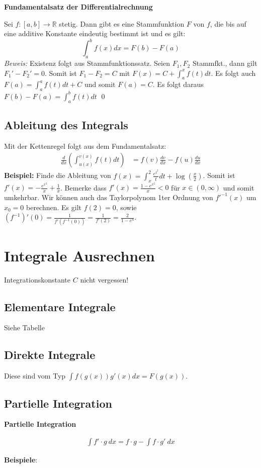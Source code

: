 \documentclass[25pt]{sciposter}
\newcommand{\R}{\mathbb{R}}
\newenvironment{method}[1]{\begin{mdframed}[backgroundcolor=blue!10,innertopmargin=15pt, innerbottommargin=15pt, nobreak=true]
		\textbf{#1 }
	}
	{ 
	\end{mdframed}
}
\newenvironment{important}{\begin{mdframed}[backgroundcolor=red!50,innertopmargin=15pt, innerbottommargin=15pt, nobreak=true]
		\Large
	}
	{ 
	\end{mdframed}
}
\begin{document}
\begin{multicols}{3}
\begin{method}{Fundamentalsatz der Differentialrechnung}
Sei $f:[a,b] \to \R$ stetig. Dann gibt es eine Stammfunktion $F$ von $f$, die bis auf eine additive Konstante eindeutig bestimmt ist und es gilt:
$$\int_{a}^{b} f(x) dx = F(b) - F(a)$$
\textit{Beweis:} Existenz folgt aus Stammfunktionssatz. Seien $F_1, F_2$ Stammfkt., dann gilt $F_1' - F_2' = 0$. Somit ist $F_1 - F_2 = C$ mit $F(x) = C + \int_{a}^{x} f(t) dt$. Es folgt auch $F(a) = \int_{a}^{a} f(t) dt + C$ und somit $F(a) = C$. Es folgt daraus $F(b)-F(a) = \int_{a}^{b} f(t) dt$ \qed 
\end{method}


\subsection*{Ableitung des Integrals}
Mit der Kettenregel folgt aus dem Fundamentalsatz:
\begin{align*}
\frac{d}{dx} \left( \int_{u(x)}^{v(x)} f(t)  dt \right) &= f(v)\frac{dv}{dx} - f(u)\frac{du}{dx}
\end{align*}
\textbf{Beispiel:} Finde die Ableitung von $f(x) = \int_{x}^{2} \frac{e^{t^2}}{t} dt + \log(\frac{x}{2})$. Somit ist $f'(x) = -\frac{e^{x^2}}{x} + \frac{1}{x}$. Bemerke dass $f'(x) = \frac{1-e^{x^2}}{x}<0$ für $x \in (0, \infty)$ und somit umkehrbar.
Wir können auch das Taylorpolynom 1ter Ordnung von $f'^{-1}(x)$ um $x_0 = 0$ berechnen. Es gilt $f(2) = 0$, sowie $(f^{-1})'(0) = \frac{1}{f'(f^{-1}(0))} = \frac{1}{f'(2)} = \frac{2}{1-e^4}$.

\section*{Integrale Ausrechnen}

\begin{important}
Integrationskonstante $C$ nicht vergessen!
\end{important}

\subsection*{Elementare Integrale}
Siehe Tabelle

\subsection*{Direkte Integrale}
Diese sind vom Typ $\int f(g(x)) g'(x) dx = F(g(x))$.

\subsection*{Partielle Integration}
\begin{method}{Partielle Integration}
\begin{align*}
	\int f' \cdot g \ dx = f \cdot g - \int f \cdot g' \  dx
\end{align*}
\end{method}
\textbf{Beispiele}:



\end{multicols}
\end{document}
